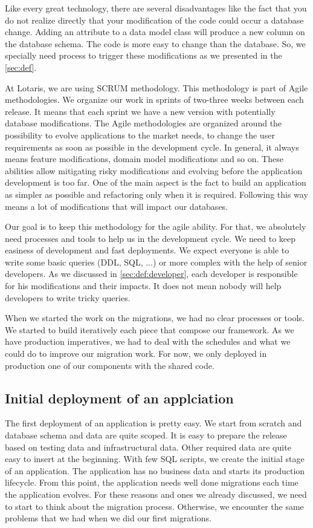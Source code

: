 Like every great technology, there are several disadvantages like the fact that you do not realize directly that your modification of the code could occur a database change. Adding an attribute to a data model class will produce a new column on the database schema. The code is more easy to change than the database. So, we specially need process to trigger these modifications as we presented in the \autoref{sec:def}.

At Lotaris, we are using SCRUM methodology. This methodology is part of Agile methodologies. We organize our work in sprints of two-three weeks between each release. It means that each sprint we have a new version with potentially database modifications. The Agile methodologies are organized around the possibility to evolve applications to the market needs, to change the user requirements as soon as possible in the development cycle. In general, it always means feature modifications, domain model modifications and so on. These abilities allow mitigating risky modifications and evolving before the application development is too far. One of the main aspect is the fact to build an application as simpler as possible and refactoring only when it is required. Following this way means a lot of modifications that will impact our databases.

Our goal is to keep this methodology for the agile ability. For that, we absolutely need processes and tools to help us in the development cycle. We need to keep easiness of development and fast deployments. We expect everyone is able to write some basic queries (DDL, SQL, ...) or more complex with the help of senior developers. As we discussed in \autoref{sec:def:developer}, each developer is responsible for his modifications and their impacts. It does not mean nobody will help developers to write tricky queries. 

When we started the work on the migrations, we had no clear processes or tools. We started to build iteratively each piece that compose our framework. As we have production imperatives, we had to deal with the schedules and what we could do to improve our migration work. For now, we only deployed in production one of our components with the shared code.

\subsection{Initial deployment of an applciation}

The first deployment of an application is pretty easy. We start from scratch and database schema and data are quite scoped. It is easy to prepare the release based on testing data and infrastructural data. Other required data are quite easy to insert at the beginning. With few SQL scripts, we create the initial stage of an application. The application has no business data and starts its production lifecycle. From this point, the application needs well done migrations each time the application evolves. For these reasons and ones we already discussed, we need to start to think about the migration process. Otherwise, we encounter the same problems that we had when we did our first migrations.

